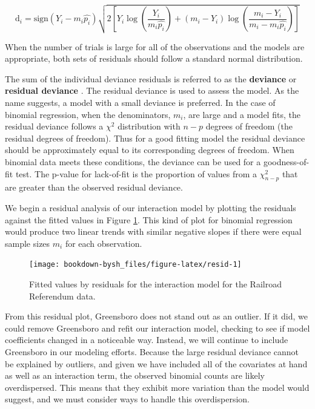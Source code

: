 \documentclass[
]{krantz}
\begin{document}
\begin{equation*}
\textrm{d}_i = 
\textrm{sign}(Y_i-m_i\hat{p_i})\sqrt{2[Y_i \log\left(\frac{Y_i}{m_i \hat{p_i}}\right)+
(m_i - Y_i) \log\left(\frac{m_i - Y_i}{m_i - m_i \hat{p_i}}\right)]}
\end{equation*}

When the number of trials is large for all of the observations and the models are appropriate, both sets of residuals should follow a standard normal distribution.

The sum of the individual deviance residuals is referred to as the \textbf{deviance} or \textbf{residual deviance} . The residual deviance is used to assess the model. As the name suggests, a model with a small deviance is preferred. In the case of binomial regression, when the denominators, \(m_i\), are large and a model fits, the residual deviance follows a \(\chi^2\) distribution with \(n-p\) degrees of freedom (the residual degrees of freedom). Thus for a good fitting model the residual deviance should be approximately equal to its corresponding degrees of freedom. When binomial data meets these conditions, the deviance can be used for a goodness-of-fit test. The p-value for lack-of-fit is the proportion of values from a \(\chi_{n-p}^2\) that are greater than the observed residual deviance.

We begin a residual analysis of our interaction model by plotting the residuals against the fitted values in Figure \ref{fig:resid}. This kind of plot for binomial regression would produce two linear trends with similar negative slopes if there were equal sample sizes \(m_i\) for each observation.

\begin{figure}

{\centering \texttt{[image: bookdown-bysh\_files/figure-latex/resid-1]} 

}

\caption{Fitted values by residuals for the interaction model for the Railroad Referendum data.}\label{fig:resid}
\end{figure}

From this residual plot, Greensboro does not stand out as an outlier. If it did, we could remove Greensboro and refit our interaction model, checking to see if model coefficients changed in a noticeable way. Instead, we will continue to include Greensboro in our modeling efforts. Because the large residual deviance cannot be explained by outliers, and given we have included all of the covariates at hand as well as an interaction term, the observed binomial counts are likely overdispersed. This means that they exhibit more variation than the model would suggest, and we must consider ways to handle this overdispersion.
\end{document}
